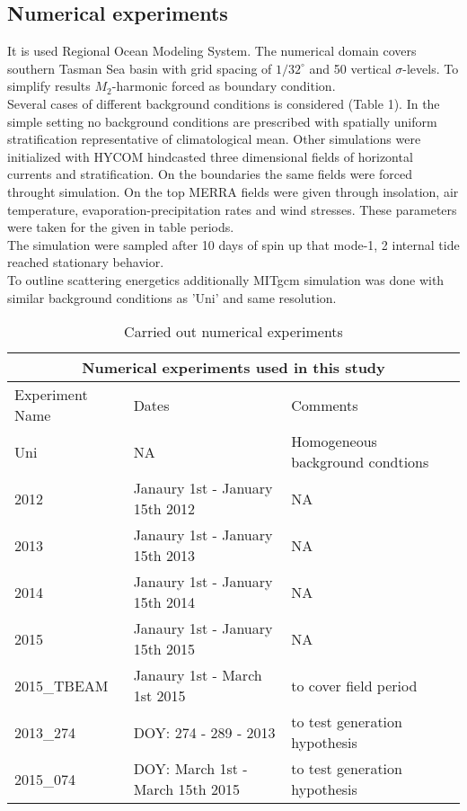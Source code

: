 \subsection{Numerical experiments}
It is used Regional Ocean Modeling System. The numerical domain covers southern Tasman Sea basin with grid spacing of $1/32^{\circ}$ and 50 vertical $\sigma$-levels. To simplify results $M_2$-harmonic forced as boundary condition.\\
Several cases of different background conditions is considered (Table 1). In the simple setting no background conditions are prescribed with spatially uniform stratification  representative of climatological mean. Other simulations were initialized with HYCOM hindcasted three dimensional fields of horizontal currents and stratification. On the boundaries the same fields were forced throught simulation. On the top MERRA fields were given through insolation, air temperature, evaporation-precipitation rates and wind stresses. These parameters were taken for the given in table periods.\\
The simulation were sampled after 10 days of spin up that mode-1, 2 internal tide reached stationary behavior.\\
To outline scattering energetics additionally MITgcm simulation was done with similar background conditions as 'Uni' and same resolution.\\
\begin{table}
 \caption{Carried out numerical experiments}
 \begin{tabular}{ |p{3cm}||p{5cm}|p{5cm}|  }
 \hline
 \multicolumn{3}{|c|}{Numerical experiments used in this study} \\
 \hline
Experiment Name & Dates & Comments \\
 \hline
Uni & NA & Homogeneous background condtions \\
2012 &   Janaury 1st - January 15th 2012 & NA \\
2013 &   Janaury 1st - January 15th 2013 & NA \\
2014 &   Janaury 1st - January 15th 2014 & NA \\
2015 &   Janaury 1st - January 15th 2015 & NA \\
2015\_TBEAM &   Janaury 1st - March 1st 2015 & to cover field period \\
2013\_274 &   DOY: 274 - 289 - 2013 & to test generation hypothesis \\
2015\_074 &   DOY: March 1st - March 15th 2015 & to test generation hypothesis \\
 \hline
\end{tabular}
\end{table}

